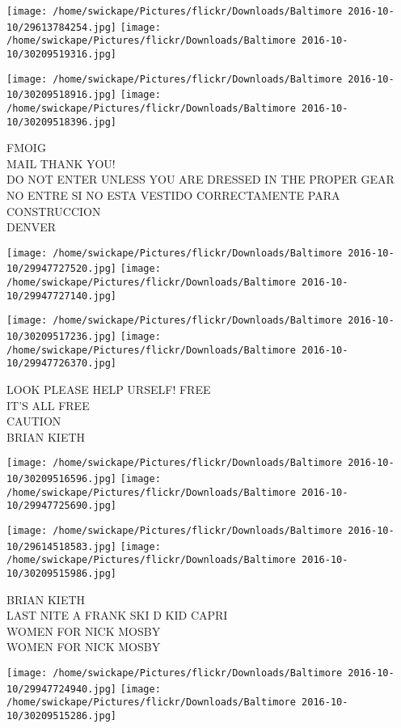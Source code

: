 \documentclass[10pt,letterpaper]{article}
\begin{document}
\texttt{[image: /home/swickape/Pictures/flickr/Downloads/Baltimore 2016-10-10/29613784254.jpg]}
\texttt{[image: /home/swickape/Pictures/flickr/Downloads/Baltimore 2016-10-10/30209519316.jpg]}

\texttt{[image: /home/swickape/Pictures/flickr/Downloads/Baltimore 2016-10-10/30209518916.jpg]}
\texttt{[image: /home/swickape/Pictures/flickr/Downloads/Baltimore 2016-10-10/30209518396.jpg]}

FMOIG\\
MAIL THANK YOU!\\
DO NOT ENTER UNLESS YOU ARE DRESSED IN THE PROPER GEAR NO ENTRE SI NO ESTA VESTIDO CORRECTAMENTE PARA CONSTRUCCION\\
DENVER\\
\pagebreak

\texttt{[image: /home/swickape/Pictures/flickr/Downloads/Baltimore 2016-10-10/29947727520.jpg]}
\texttt{[image: /home/swickape/Pictures/flickr/Downloads/Baltimore 2016-10-10/29947727140.jpg]}

\texttt{[image: /home/swickape/Pictures/flickr/Downloads/Baltimore 2016-10-10/30209517236.jpg]}
\texttt{[image: /home/swickape/Pictures/flickr/Downloads/Baltimore 2016-10-10/29947726370.jpg]}

LOOK PLEASE HELP URSELF!  FREE\\
IT'S ALL FREE\\
CAUTION\\
BRIAN KIETH\\
\pagebreak

\texttt{[image: /home/swickape/Pictures/flickr/Downloads/Baltimore 2016-10-10/30209516596.jpg]}
\texttt{[image: /home/swickape/Pictures/flickr/Downloads/Baltimore 2016-10-10/29947725690.jpg]}

\texttt{[image: /home/swickape/Pictures/flickr/Downloads/Baltimore 2016-10-10/29614518583.jpg]}
\texttt{[image: /home/swickape/Pictures/flickr/Downloads/Baltimore 2016-10-10/30209515986.jpg]}

BRIAN KIETH\\
LAST NITE A FRANK SKI D KID CAPRI\\
WOMEN FOR NICK MOSBY\\
WOMEN FOR NICK MOSBY\\
\pagebreak

\texttt{[image: /home/swickape/Pictures/flickr/Downloads/Baltimore 2016-10-10/29947724940.jpg]}
\texttt{[image: /home/swickape/Pictures/flickr/Downloads/Baltimore 2016-10-10/30209515286.jpg]}
\end{document}
